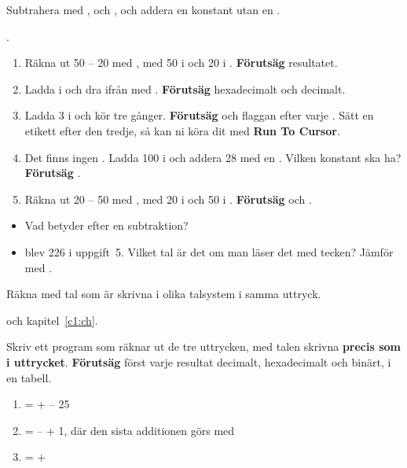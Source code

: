 
\label{lab3:d4}
Subtrahera med ,  och , och addera en konstant utan en
.

.

\begin{enumerate}
  \item Räkna ut 50 -- 20 med , med 50 i  och 20 i .
    \textbf{Förutsäg} resultatet.
  \item Ladda  i  och dra ifrån  med . \textbf{Förutsäg}
     hexadecimalt och decimalt.
  \item Ladda 3 i  och kör  tre gånger. \textbf{Förutsäg}  och
    flaggan  efter varje . Sätt en etikett efter den tredje, så kan ni köra dit
    med \textbf{Run To Cursor}.
  \item Det finns ingen . Ladda 100 i  och addera 28 med en .
    Vilken konstant ska  ha? \textbf{Förutsäg} .
  \item Räkna ut 20 -- 50 med , med 20 i  och 50 i .
    \textbf{Förutsäg}  och .
\end{enumerate}

\begin{itemize}
  \item Vad betyder  efter en subtraktion?
  \item {} blev 226 i uppgift~5. Vilket tal är det om man läser det med tecken? Jämför med
    .
\end{itemize}


%
\label{lab3:d5}
Räkna med tal som är skrivna i olika talsystem i samma uttryck.

 och kapitel~\ref{c1:ch}.

Skriv ett program som räknar ut de tre uttrycken, med talen skrivna \textbf{precis som i
uttrycket}. \textbf{Förutsäg} först varje resultat decimalt, hexadecimalt och binärt, i en tabell.
\begin{enumerate}
  \item {} =  +  -- 25
  \item {} =  --  + 1, där den sista additionen görs med
  \item {} =  + 
\end{enumerate}

